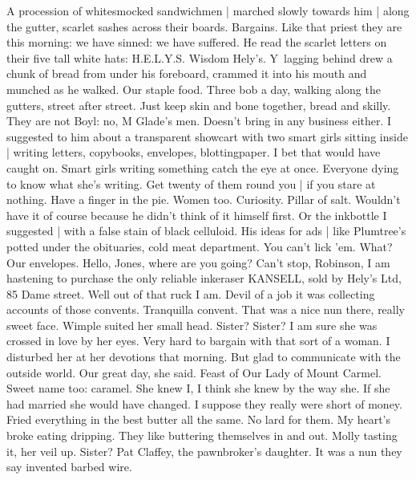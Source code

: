A procession of whitesmocked sandwichmen |
marched slowly towards him |
along the gutter,
scarlet sashes across their boards.
Bargains.
Like that priest they are this morning:
we have sinned:
we have suffered.
He read the scarlet letters on their five tall white hats:
H.E.L.Y.S.
Wisdom Hely's.
Y~lagging behind
drew a chunk of bread from under his foreboard,
crammed it into his mouth
and munched as he walked.
Our staple food.
Three bob a day,
walking along the gutters,
street after street.
Just keep skin and bone together,
bread and skilly.
They are not Boyl:
no, M Glade's men.
Doesn't bring in any business either.
I suggested to him about a transparent showcart
with two smart girls sitting inside |
writing letters, copybooks, envelopes, blottingpaper.
I bet that would have caught on.
Smart girls writing something catch the eye at once.
Everyone dying to know what she's writing.
Get twenty of them round you |
if you stare at nothing.
Have a finger in the pie.
Women too.
Curiosity.
Pillar of salt.
Wouldn't have it of course
because he didn't think of it himself first.
Or the inkbottle I suggested |
with a false stain of black celluloid.
His ideas for ads |
like Plumtree's potted under the obituaries,
cold meat department.
You can't lick 'em.
What?
Our envelopes.
Hello, Jones, where are you going?
Can't stop, Robinson,
I am hastening to purchase the only reliable inkeraser KANSELL,
sold by Hely's Ltd, 85 Dame street.
Well out of that ruck I am.
Devil of a job it was collecting accounts of those convents.
Tranquilla convent.
That was a nice nun there, really sweet face.
Wimple suited her small head.
Sister?
Sister?
I am sure she was crossed in love by her eyes.
Very hard to bargain with that sort of a woman.
I disturbed her at her devotions that morning.
But glad to communicate with the outside world.
Our great day, she said.
Feast of Our Lady of Mount Carmel.
Sweet name too:
caramel.
She knew I,
I think she knew by the way she.
If she had married she would have changed.
I suppose they really were short of money.
Fried everything in the best butter all the same.
No lard for them.
My heart's broke eating dripping.
They like buttering themselves in and out.
Molly tasting it, her veil up.
Sister?
Pat Claffey, the pawnbroker's daughter.
It was a nun they say invented barbed wire.

